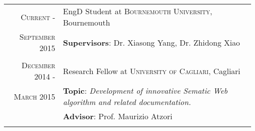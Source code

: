 \documentclass[a4paper,10pt]{article} %
\begin{document}
\begin{tabular}{r|p{11cm}}

\textsc{Current -} & EngD Student at \textsc{Bournemouth University}, Bournemouth \\
\textsc{September 2015} & \small \textbf{Supervisors}: Dr. Xiasong Yang, Dr. Zhidong Xiao\\
\multicolumn{2}{c}{} \\


\textsc{December 2014 -} & Research Fellow at \textsc{University of Cagliari}, Cagliari \\
\textsc{March 2015} & \textbf{Topic}: \emph{Development of innovative Sematic Web algorithm and related documentation.}\\ 
& \small \textbf{Advisor}: Prof. Maurizio Atzori\\
\multicolumn{2}{c}{} \\




\end{tabular}
\end{document}

